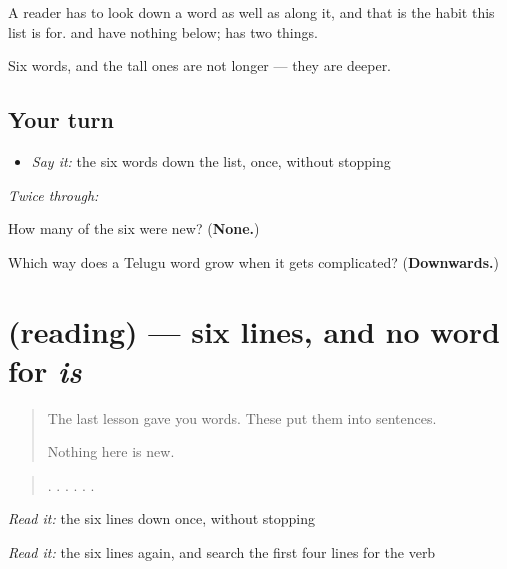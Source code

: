A reader has to look down a word as well as along it, and that is the habit this list is for. \textbf{} and \textbf{} have nothing below; \textbf{} has two things.

Six words, and the tall ones are not longer — they are deeper.

\subsection*{Your turn}
\begin{itemize}
\raggedright
  \item \emph{Say it:} the six words down the list, once, without stopping
\end{itemize}

\emph{Twice through:}

\begin{tcolorbox}[breakable,colback=teal!4,colframe=teal!35!black,title={Before you move on}]
How many of the six were new? (\textbf{None.})

Which way does a Telugu word grow when it gets complicated? (\textbf{Downwards.})
\end{tcolorbox}
\section[(reading)]{(reading) — six lines, and no word for \emph{is}}

\label{lesson:TE-C83-lines}



\begin{quote}
The last lesson gave you words. These put them into sentences.

Nothing here is new.
\end{quote}

\begin{tcolorbox}[breakable,skin=enhanced,colback=orange!6,colframe=orange!45!black,boxrule=0.5pt,arc=1mm,left=6pt,right=6pt,top=4pt,bottom=4pt,fonttitle=\bfseries,title={Read this}]
\begin{quote}
 .  .  .  . . .
\end{quote}

\emph{Read it:} the six lines down once, without stopping

\emph{Read it:} the six lines again, and search the first four lines for the verb
\end{tcolorbox}

